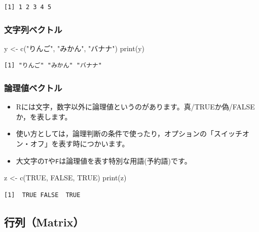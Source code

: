 \documentclass[
  a4paper,
]{ltjsbook}
\newenvironment{Shaded}{\begin{snugshade}}{\end{snugshade}}
\newcommand{\ConstantTok}[1]{\textcolor[rgb]{0.56,0.35,0.01}{#1}}
\newcommand{\FunctionTok}[1]{\textcolor[rgb]{0.28,0.35,0.67}{#1}}
\newcommand{\NormalTok}[1]{\textcolor[rgb]{0.00,0.23,0.31}{#1}}
\newcommand{\OtherTok}[1]{\textcolor[rgb]{0.00,0.23,0.31}{#1}}
\newcommand{\StringTok}[1]{\textcolor[rgb]{0.13,0.47,0.30}{#1}}
\providecommand{\tightlist}{%
  \setlength{\itemsep}{0pt}\setlength{\parskip}{0pt}}\usepackage{longtable,booktabs,array}
\begin{document}
\begin{verbatim}
[1] 1 2 3 4 5
\end{verbatim}

\subsubsection{文字列ベクトル}\label{ux6587ux5b57ux5217ux30d9ux30afux30c8ux30eb}

\begin{Shaded}
\begin{Highlighting}[]
\NormalTok{y }\OtherTok{\textless{}{-}} \FunctionTok{c}\NormalTok{(}\StringTok{"りんご"}\NormalTok{, }\StringTok{"みかん"}\NormalTok{, }\StringTok{"バナナ"}\NormalTok{)}
\FunctionTok{print}\NormalTok{(y)}
\end{Highlighting}
\end{Shaded}

\begin{verbatim}
[1] "りんご" "みかん" "バナナ"
\end{verbatim}

\subsubsection{論理値ベクトル}\label{ux8ad6ux7406ux5024ux30d9ux30afux30c8ux30eb}

\begin{itemize}
\tightlist
\item
  Rには文字，数字以外に論理値というのがあります。真/TRUEか偽/FALSEか，を表します。
\item
  使い方としては，論理判断の条件で使ったり，オプションの「スイッチオン・オフ」を表す時につかいます。
\item
  大文字の\texttt{T}や\texttt{F}は論理値を表す特別な用語(予約語)です。
\end{itemize}

\begin{Shaded}
\begin{Highlighting}[]
\NormalTok{z }\OtherTok{\textless{}{-}} \FunctionTok{c}\NormalTok{(}\ConstantTok{TRUE}\NormalTok{, }\ConstantTok{FALSE}\NormalTok{, }\ConstantTok{TRUE}\NormalTok{)}
\FunctionTok{print}\NormalTok{(z)}
\end{Highlighting}
\end{Shaded}

\begin{verbatim}
[1]  TRUE FALSE  TRUE
\end{verbatim}

\subsection{行列（Matrix）}\label{ux884cux5217matrix}
\end{document}
